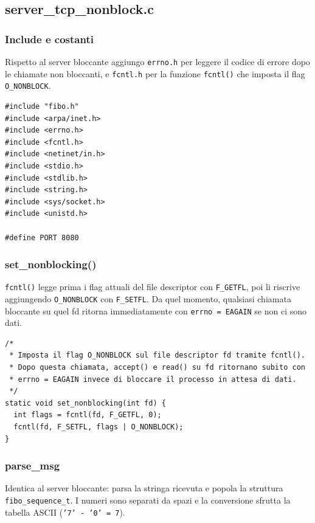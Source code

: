 \documentclass[a4paper,12pt]{article}
\begin{document}
\subsection{server\_tcp\_nonblock.c}

\subsubsection{Include e costanti}
Rispetto al server bloccante aggiungo \texttt{errno.h} per leggere il codice
di errore dopo le chiamate non bloccanti, e \texttt{fcntl.h} per la funzione
\texttt{fcntl()} che imposta il flag \texttt{O\_NONBLOCK}.

\begin{lstlisting}[caption={server\_tcp\_nonblock.c - Include}]
#include "fibo.h"
#include <arpa/inet.h>
#include <errno.h>
#include <fcntl.h>
#include <netinet/in.h>
#include <stdio.h>
#include <stdlib.h>
#include <string.h>
#include <sys/socket.h>
#include <unistd.h>

#define PORT 8080
\end{lstlisting}
\FloatBarrier

\subsubsection{set\_nonblocking()}
\texttt{fcntl()} legge prima i flag attuali del file descriptor con
\texttt{F\_GETFL}, poi li riscrive aggiungendo \texttt{O\_NONBLOCK} con
\texttt{F\_SETFL}. Da quel momento, qualsiasi chiamata bloccante su quel fd
ritorna immediatamente con \texttt{errno = EAGAIN} se non ci sono dati.

\begin{lstlisting}[caption={server\_tcp\_nonblock.c - set\_nonblocking()}]
/*
 * Imposta il flag O_NONBLOCK sul file descriptor fd tramite fcntl().
 * Dopo questa chiamata, accept() e read() su fd ritornano subito con
 * errno = EAGAIN invece di bloccare il processo in attesa di dati.
 */
static void set_nonblocking(int fd) {
  int flags = fcntl(fd, F_GETFL, 0);
  fcntl(fd, F_SETFL, flags | O_NONBLOCK);
}
\end{lstlisting}
\FloatBarrier

\subsubsection{parse\_msg}
Identica al server bloccante: parsa la stringa ricevuta e popola la struttura
\texttt{fibo\_sequence\_t}. I numeri sono separati da spazi e la conversione
sfrutta la tabella ASCII (\texttt{'7' - '0' = 7}).
\end{document}
